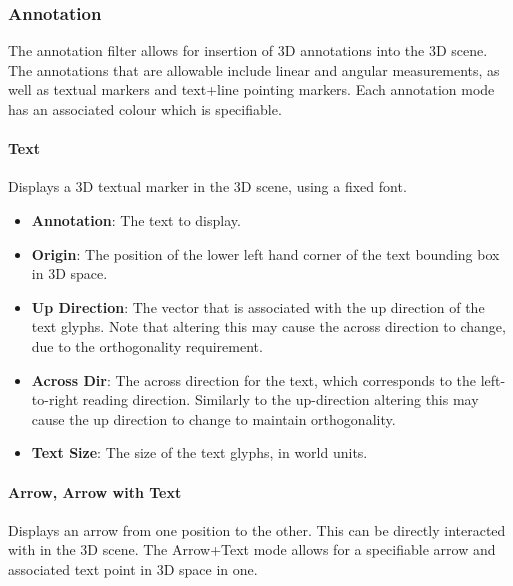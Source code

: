 \documentclass[10pt]{article}
\begin{document}
\FloatBarrier
\subsubsection{Annotation}
The annotation filter allows for insertion of 3D annotations into the 3D scene. The annotations that are allowable include linear and angular measurements, as well as textual markers and text+line pointing markers. Each annotation mode has an associated colour which is specifiable. 

\paragraph{Text}
Displays a 3D textual marker in the 3D scene, using a fixed font.
\begin{itemize}
\item \textbf{Annotation}: The text to display.
\item \textbf{Origin}: The position of the lower left hand corner of the text bounding box in 3D space.
\item \textbf{Up Direction}: The vector that is associated with the up direction of the text glyphs. Note that altering this may cause the across direction to change, due to the orthogonality requirement.
\item \textbf{Across Dir}: The across direction for the text, which corresponds to the left-to-right reading direction. Similarly to the up-direction altering this may cause the up direction to change to maintain orthogonality.
\item \textbf{Text Size}: The size of the text glyphs, in world units.
\end{itemize}

\paragraph{Arrow, Arrow with Text}
Displays an arrow from one position to the other. This can be directly interacted with in the 3D scene. The Arrow+Text mode allows for a specifiable arrow and associated text point in 3D space in one. 
\end{document}
